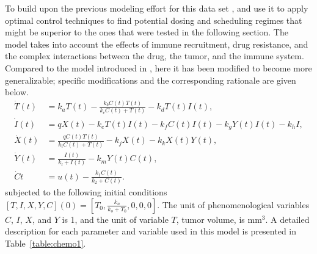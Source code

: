 To build upon the previous modeling effort for this data set \cite{tran2020delicate}, and use it to apply optimal control techniques to find potential dosing and scheduling regimes that might be superior to the ones that were tested in the following section. 
The model takes into account the effects of immune recruitment, drug resistance, and the complex interactions between the drug, the tumor, and the immune system. Compared to the model introduced in \cite{tran2020delicate}, here it has been modified to become more generalizable; specific modifications and the corresponding rationale are given below.
\begin{subequations} \label{eq:chemo1}
	\begin{align} 
		\dot{T}(t) &=  k_{a} T(t) - \frac{k_{b}C(t)T(t)}{k_{c}C(t)+T(t)} - k_{d}T(t)I(t),\\
		\dot{I}(t) &= q X(t) -k_{e}T(t)I(t)-k_{f}C(t)I(t)-k_{g}Y(t)I(t)-k_{h}I,\\
		\dot{X}(t) &= \frac{q C(t)T(t)}{k_{i}C(t)+T(t)}-k_{j}X(t)-k_{k}X(t)Y(t),\\
		\dot{Y}(t) &= \frac{I(t)}{k_l+I(t)} - k_{m}Y(t) C(t),\\
		\dot{C}{t} &= u(t) - \frac{k_1 C(t)}{k_2 + C(t)}.
	\end{align}
\end{subequations}
subjected to the following initial conditions $[T,I,X,Y,C](0)=[T_0,\frac{k_n}{k_o+T_0},0,0,0]$. The unit of phenomenological variables $C$, $I$, $X$, and $Y$ is 1, and the unit of variable $T$, tumor volume, is mm$^3$. A detailed description for each parameter and variable used in this model is presented in Table~\ref{table:chemo1}.
%

